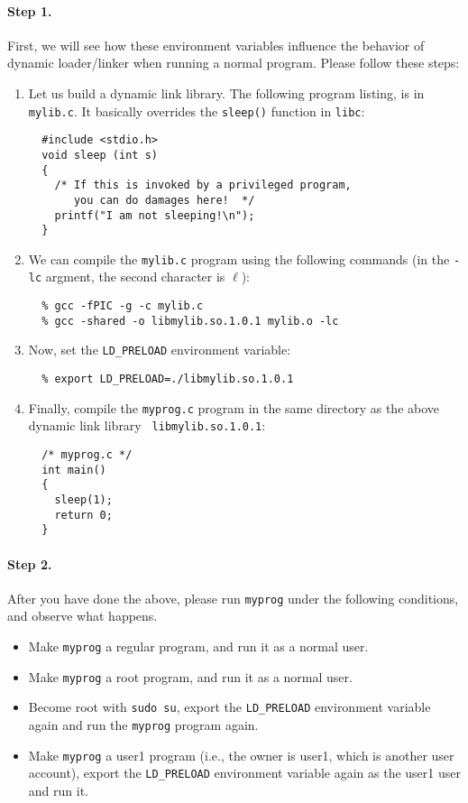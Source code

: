\paragraph{Step 1.} 
First, we will see how these environment variables influence the 
behavior of dynamic loader/linker when running a normal program. 
Please follow these steps:


  \begin{enumerate}
  \item Let us build a dynamic link library. The following program listing,
  is in {\tt mylib.c}. It basically overrides the {\tt sleep()} function 
  in {\tt libc}:
  \begin{verbatim}
  #include <stdio.h>
  void sleep (int s)
  {
    /* If this is invoked by a privileged program, 
       you can do damages here!  */
    printf("I am not sleeping!\n");
  }
  \end{verbatim}

  \item We can compile the {\tt mylib.c} program using the following commands (in the 
  {\tt -lc} argment, the second character is $\ell$):
  \begin{verbatim}
  % gcc -fPIC -g -c mylib.c
  % gcc -shared -o libmylib.so.1.0.1 mylib.o -lc
  \end{verbatim}

  

  \item Now, set the {\tt LD\_PRELOAD} environment variable:  
  \begin{verbatim}
  % export LD_PRELOAD=./libmylib.so.1.0.1  
  \end{verbatim}

  \item Finally, compile the {\tt myprog.c} program
  in the same directory as the above dynamic link library {\tt
  libmylib.so.1.0.1}:
  \begin{verbatim}
  /* myprog.c */
  int main()
  {
    sleep(1);
    return 0;
  }
  \end{verbatim}
  \end{enumerate}


\paragraph{Step 2.} 
After you have done the above, please run {\tt myprog} under the following
conditions, and observe what happens. 

  \begin{itemize}
  \item Make {\tt myprog} a regular program, and run it as a normal user.
  \item Make {\tt myprog} a \setuid root program, and run it as a normal user.
  \item Become root with {\tt sudo su}, export the {\tt LD\_PRELOAD}
  environment variable again and run the {\tt myprog} program again.

  \item Make {\tt myprog} a \setuid user1 program (i.e., the owner is user1, which 
        is another user account), export the {\tt LD\_PRELOAD} environment variable 
	again as the user1 user and run it.
  \end{itemize}


